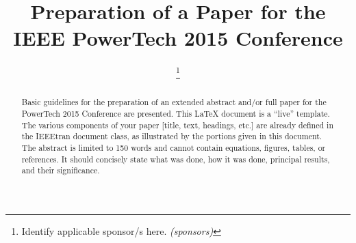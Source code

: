 \documentclass[conference]{IEEEtran}
\begin{document}
%
\title{Preparation of a Paper for the\\
IEEE PowerTech 2015 Conference}


\author{%

\and
{}

%

\thanks{Identify applicable sponsor/s here. \emph{(sponsors)}}%

}



\maketitle

\begin{abstract}
Basic guidelines for the preparation of an extended abstract and/or full paper for the PowerTech 2015 Conference are presented. This \LaTeX{} document is a ``live'' template. The various components of your paper [title, text, headings, etc.] are already defined in the IEEEtran document class, as illustrated by the portions given in this document. The abstract is limited to 150 words and cannot contain equations, figures, tables, or references. It should concisely state what was done, how it was done, principal results, and their significance.\\
\end{abstract}
\end{document}
